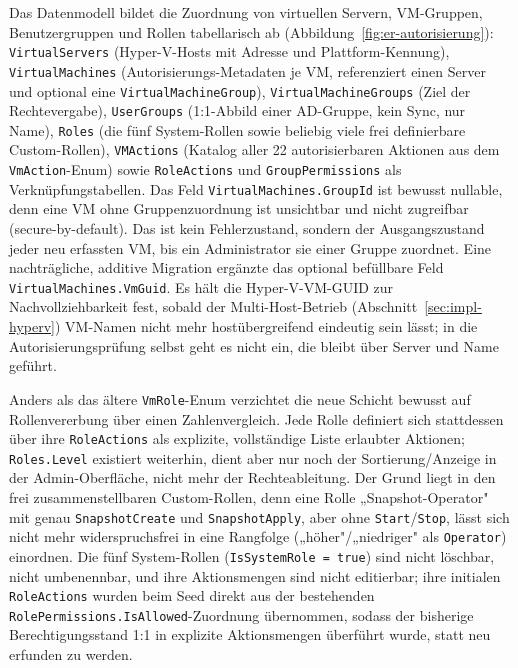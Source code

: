 \documentclass[12pt,a4paper]{article}
\begin{document}
Das Datenmodell bildet die Zuordnung von virtuellen Servern, VM-Gruppen, Benutzergruppen und Rollen tabellarisch ab (Abbildung~\ref{fig:er-autorisierung}): \texttt{VirtualServers} (Hyper-V-Hosts mit Adresse und Plattform-Kennung), \texttt{VirtualMachines} (Autorisierungs-Metadaten je VM, referenziert einen Server und optional eine \texttt{VirtualMachineGroup}), \texttt{VirtualMachineGroups} (Ziel der Rechtevergabe), \texttt{UserGroups} (1:1-Abbild einer AD-Gruppe, kein Sync, nur Name), \texttt{Roles} (die fünf System-Rollen sowie beliebig viele frei definierbare Custom-Rollen), \texttt{VMActions} (Katalog aller 22 autorisierbaren Aktionen aus dem \texttt{VmAction}-Enum) sowie \texttt{RoleActions} und \texttt{GroupPermissions} als Verknüpfungstabellen. Das Feld \texttt{VirtualMachines.GroupId} ist bewusst nullable, denn eine VM ohne Gruppenzuordnung ist unsichtbar und nicht zugreifbar (secure-by-default). Das ist kein Fehlerzustand, sondern der Ausgangszustand jeder neu erfassten VM, bis ein Administrator sie einer Gruppe zuordnet. Eine nachträgliche, additive Migration ergänzte das optional befüllbare Feld \texttt{VirtualMachines.VmGuid}. Es hält die Hyper-V-VM-GUID zur Nachvollziehbarkeit fest, sobald der Multi-Host-Betrieb (Abschnitt~\ref{sec:impl-hyperv}) VM-Namen nicht mehr hostübergreifend eindeutig sein lässt; in die Autorisierungsprüfung selbst geht es nicht ein, die bleibt über Server und Name geführt.

Anders als das ältere \texttt{VmRole}-Enum verzichtet die neue Schicht bewusst auf Rollenvererbung über einen Zahlenvergleich. Jede Rolle definiert sich stattdessen über ihre \texttt{RoleActions} als explizite, vollständige Liste erlaubter Aktionen; \texttt{Roles.Level} existiert weiterhin, dient aber nur noch der Sortierung/Anzeige in der Admin-Oberfläche, nicht mehr der Rechteableitung. Der Grund liegt in den frei zusammenstellbaren Custom-Rollen, denn eine Rolle „Snapshot-Operator" mit genau \texttt{SnapshotCreate} und \texttt{SnapshotApply}, aber ohne \texttt{Start}/\texttt{Stop}, lässt sich nicht mehr widerspruchsfrei in eine Rangfolge („höher"/„niedriger" als \texttt{Operator}) einordnen. Die fünf System-Rollen (\texttt{IsSystemRole = true}) sind nicht löschbar, nicht umbenennbar, und ihre Aktionsmengen sind nicht editierbar; ihre initialen \texttt{RoleActions} wurden beim Seed direkt aus der bestehenden \texttt{RolePermissions.IsAllowed}-Zuordnung übernommen, sodass der bisherige Berechtigungsstand 1:1 in explizite Aktionsmengen überführt wurde, statt neu erfunden zu werden.
\end{document}
